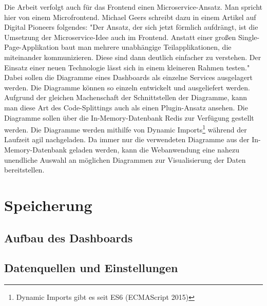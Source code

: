Die Arbeit verfolgt auch für das Frontend einen Microservice-Ansatz. Man spricht hier von einem
Microfrontend. Michael Geers schreibt dazu in einem Artikel auf Digital Pioneers folgendes:
"Der Ansatz, der sich jetzt förmlich aufdrängt, ist die Umsetzung der Microservice-Idee
auch im Frontend. Anstatt einer ­großen Single-Page-Applikation baut man mehrere unabhängige
Teilapplikationen, die miteinander kommunizieren. Diese sind dann deutlich einfacher zu verstehen.
Der Einsatz einer neuen Technologie lässt sich in einem kleineren Rahmen testen."\cite{MicrofrontendT3N}
Dabei sollen die Diagramme eines Dashboards als einzelne Services ausgelagert werden.
Die Diagramme können so einzeln entwickelt und ausgeliefert werden. Aufgrund der
gleichen Machenschaft der Schnittstellen der Diagramme, kann man diese Art des Code-Splittings auch als
einen Plugin-Ansatz ansehen. Die Diagramme sollen über die In-Memory-Datenbank
Redis zur Verfügung gestellt werden. Die Diagramme werden mithilfe
von Dynamic Imports\footnote{Dynamic Imports gibt es seit ES6 (ECMAScript 2015)\cite{DynamicImportsV8}}
während der Laufzeit agil nachgeladen. Da immer nur die verwendeten Diagramme aus der In-Memory-Datenbank
geladen werden, kann die Webanwendung eine nahezu unendliche Auswahl an möglichen Diagrammen zur Visualisierung
der Daten bereitstellen.

\section{Speicherung}
\label{sec:speicherung}

\subsection{Aufbau des Dashboards}
\label{subsec:aufbaudesdashboards}

\subsection{Datenquellen und Einstellungen}
\label{subsec:datenquellenundeinstellungen}

